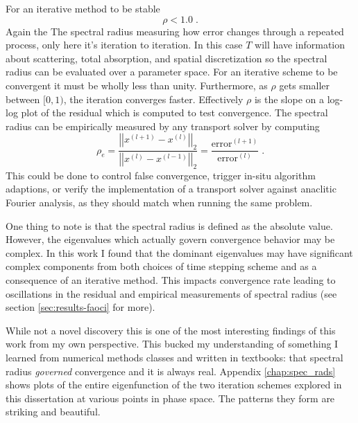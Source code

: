 For an iterative method to be stable
\begin{equation}
    \rho < 1.0 \; .
\end{equation}
Again the The spectral radius measuring how error changes through a repeated process, only here it's iteration to iteration.
In this case $T$ will have information about scattering, total absorption, and spatial discretization so the spectral radius can be evaluated over a parameter space.
For an iterative scheme to be convergent it must be wholly less than unity.
Furthermore, as $\rho$ gets smaller between $[0,1)$, the iteration converges faster.
Effectively $\rho$ is the slope on a log-log plot of the residual which is computed to test convergence.
The spectral radius can be empirically measured by any transport solver by computing
\begin{equation}
    \rho_e = \frac{\left|\left|x^{(l+1)} - x^{(l)}\right|\right|_{2}}{\left|\left|x^{(l)} - x^{(l-1)}\right|\right|_{2}} = \frac{\text{error}^{(l+1)}}{\text{error}^{(l)}} \; .
\end{equation}
This could be done to control false convergence, trigger in-situ algorithm adaptions, or verify the implementation of a transport solver against anaclitic Fourier analysis, as they should match when running the same problem.

One thing to note is that the spectral radius is defined as the absolute value.
However, the eigenvalues which actually govern convergence behavior may be complex.
In this work I found that the dominant eigenvalues may have significant complex components from both choices of time stepping scheme \cite{ilham_phd, ilham} and as a consequence of an iterative method.
This impacts convergence rate leading to oscillations in the residual and empirical measurements of spectral radius (see section \ref{sec:results-faoci} for more).

While not a novel discovery \cite{anistratov_iterative_2015} this is one of the most interesting findings of this work from my own perspective.
This bucked my understanding of something I learned from numerical methods classes and written in textbooks:
that spectral radius \emph{governed} convergence and it is always real.
Appendix \ref{chap:spec_rads} shows plots of the entire eigenfunction of the two iteration schemes explored in this dissertation at various points in phase space.
The patterns they form are striking and beautiful.

